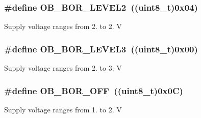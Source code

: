 \subsubsection[{\texorpdfstring{O\+B\+\_\+\+B\+O\+R\+\_\+\+L\+E\+V\+E\+L2}{OB_BOR_LEVEL2}}]{\setlength{\rightskip}{0pt plus 5cm}\#define O\+B\+\_\+\+B\+O\+R\+\_\+\+L\+E\+V\+E\+L2~((uint8\+\_\+t)0x04)}\hypertarget{group___f_l_a_s_h_ex___b_o_r___reset___level_gad678e849fcf817f6ed2d837538e8ebc2}{}\label{group___f_l_a_s_h_ex___b_o_r___reset___level_gad678e849fcf817f6ed2d837538e8ebc2}
Supply voltage ranges from 2. to 2. V 
\subsubsection[{\texorpdfstring{O\+B\+\_\+\+B\+O\+R\+\_\+\+L\+E\+V\+E\+L3}{OB_BOR_LEVEL3}}]{\setlength{\rightskip}{0pt plus 5cm}\#define O\+B\+\_\+\+B\+O\+R\+\_\+\+L\+E\+V\+E\+L3~((uint8\+\_\+t)0x00)}\hypertarget{group___f_l_a_s_h_ex___b_o_r___reset___level_ga3132b8202c0a345e9dd33d136714b046}{}\label{group___f_l_a_s_h_ex___b_o_r___reset___level_ga3132b8202c0a345e9dd33d136714b046}
Supply voltage ranges from 2. to 3. V 
\subsubsection[{\texorpdfstring{O\+B\+\_\+\+B\+O\+R\+\_\+\+O\+FF}{OB_BOR_OFF}}]{\setlength{\rightskip}{0pt plus 5cm}\#define O\+B\+\_\+\+B\+O\+R\+\_\+\+O\+FF~((uint8\+\_\+t)0x0\+C)}\hypertarget{group___f_l_a_s_h_ex___b_o_r___reset___level_gaabc231cb1d05a94fe860f67bb5a37b12}{}\label{group___f_l_a_s_h_ex___b_o_r___reset___level_gaabc231cb1d05a94fe860f67bb5a37b12}
Supply voltage ranges from 1. to 2. V 
